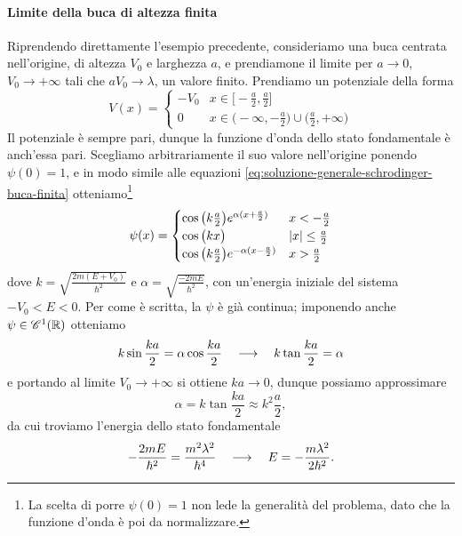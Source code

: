 \paragraph{Limite della buca di altezza finita}
Riprendendo direttamente l'esempio precedente, consideriamo una buca centrata nell'origine, di altezza $V_0$ e larghezza $a$, e prendiamone il limite per $a\to 0$, $V_0\to+\infty$ tali che $aV_0\to\lambda$, un valore finito.
Prendiamo un potenziale della forma
\begin{equation}
	V(x)=
	\begin{cases}
		-V_0	&x\in\big[-\frac{a}2,\frac{a}2\big]\\
		0		&x\in\big(-\infty,-\frac{a}2\big)\cup\big(\frac{a}2,+\infty\big)
	\end{cases}
\end{equation}
Il potenziale è sempre pari, dunque la funzione d'onda dello stato fondamentale è anch'essa pari.
Scegliamo arbitrariamente il suo valore nell'origine ponendo $\psi(0)=1$, e in modo simile alle equazioni \eqref{eq:soluzione-generale-schrodinger-buca-finita} otteniamo\footnote{La scelta di porre $\psi(0)=1$ non lede la generalità del problema, dato che la funzione d'onda è poi da normalizzare.}
\begin{equation}
	\psi(x)=
	\begin{cases}
		\cos\big(k\frac{a}2\big)e^{\alpha(x+\frac{a}2)}		&x<-\frac{a}2\\
		\cos\big(kx\big)									&\left|{x}\right|\le\frac{a}2\\
		\cos\big(k\frac{a}2\big)e^{-\alpha(x-\frac{a}2)}	&x>\frac{a}2
	\end{cases}
	\label{eq:soluzione-generale-delta-attrattivo}
\end{equation}
dove $k=\sqrt{\frac{2m(E+V_0)}{\hbar^2}}$ e $\alpha=\sqrt{\frac{-2mE}{\hbar^2}}$, con un'energia iniziale del sistema $-V_0<E<0$.
Per come è scritta, la $\psi$ è già continua; imponendo anche $\psi\in\mathscr{C}^{{1}}(\mathbb{R})$ otteniamo
\begin{equation}
	k\sin\frac{ka}2=\alpha\cos\frac{ka}2\quad\longrightarrow\quad k\tan\frac{ka}2=\alpha
	\label{eq:condizione-C1-delta-attrattivo}
\end{equation}
e portando al limite $V_0\to+\infty$ si ottiene $ka\to 0$, dunque possiamo approssimare
\begin{equation}
	\alpha=k\tan\frac{ka}2\approx k^2\frac{a}2,
\end{equation}
da cui troviamo l'energia dello stato fondamentale
\begin{equation}
	-\frac{2mE}{\hbar^2}=\frac{m^2\lambda^2}{\hbar^4}\quad\longrightarrow\quad E=-\frac{m\lambda^2}{2\hbar^2}.
	\label{eq:E-fondamentale-delta-attrattivo}
\end{equation}
